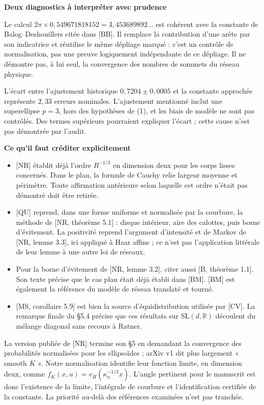 \documentclass[11pt,a4paper]{article}
\newcommand{\R}{\mathbb R}\newcommand{\Z}{\mathbb Z}
\newcommand{\head}[1]{\vspace{3pt}{\large\bfseries\color{navy}#1}\par}
\newcommand{\subhead}[1]{{\bfseries\color{navy}#1}\par}
\begin{document}
\subhead{Deux diagnostics à interpréter avec prudence}
Le calcul $2\pi\times0{,}549671818152=3{,}453689892\ldots$ est cohérent avec la constante de Balog--Deshouillers citée dans [BB]. Il remplace la contribution d'une arête par son indicatrice et réutilise le même dépliage marqué : c'est un contrôle de normalisation, pas une preuve logiquement indépendante de ce dépliage. Il ne démontre pas, à lui seul, la convergence des nombres de sommets du réseau physique.

L'écart entre l'ajustement historique $0{,}7204\pm0{,}0005$ et la constante approchée représente $2{,}33$ erreurs nominales. L'ajustement mentionné inclut une superellipse $p=3$, hors des hypothèses de (1), et les biais de modèle ne sont pas contrôlés. Des termes supérieurs pourraient expliquer l'écart ; cette cause n'est pas démontrée par l'audit.

\newpage
\head{6. Sources, attribution et limite de la piste spectrale}
\subhead{Ce qu'il faut créditer explicitement}
\begin{itemize}
\item {}[NR] établit déjà l'ordre $R^{-1/3}$ en dimension deux pour les corps lisses concernés. Dans le plan, la formule de Cauchy relie largeur moyenne et périmètre. Toute affirmation antérieure selon laquelle cet ordre n'était pas démontré doit être retirée.
\item {}[QU] reprend, dans une forme uniforme et normalisée par la courbure, la méthode de [NR, théorème 5.1] : disque intérieur, aire des calottes, puis borne d'évitement. La positivité reprend l'argument d'intensité et de Markov de [NR, lemme 3.3], ici appliqué à Haar affine ; ce n'est pas l'application littérale de leur lemme à une autre loi de réseaux.
\item Pour la borne d'évitement de [NR, lemme 3.2], citer aussi [B, théorème 1.1]. Son texte précise que le cas plan était déjà établi dans [BM]. [BM] est également la référence du modèle de réseau translaté et tourné.
\item {}[MS, corollaire 5.9] est bien la source d'équidistribution utilisée par [CV]. La remarque finale du §5.4 précise que ces résultats sur $\mathrm{SL}(d,\R)$ découlent du mélange diagonal sans recours à Ratner.
\end{itemize}
La version publiée de [NR] termine son §5 en demandant la convergence des probabilités normalisées pour les ellipsoïdes ; arXiv v1 dit plus largement « smooth $K$ ». Notre normalisation identifie leur fonction limite, en dimension deux, comme $f_K(x,u)=v_H(\kappa_u^{-1/3}x)$. L'angle pertinent pour le manuscrit est donc l'existence de la limite, l'intégrale de courbure et l'identification certifiée de la constante. La priorité au-delà des références examinées n'est pas tranchée.
\end{document}
